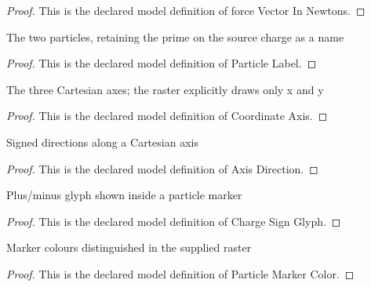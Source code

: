 \begin{proof}
  This is the declared model definition of force Vector In Newtons.
\end{proof}
\begin{definition}
  \label{def:physics:phyx-mini-0963:phyxminiproblems-problemphyxmini0963-particlelabel}
  The two particles, retaining the prime on the source charge as a name
\end{definition}
\begin{proof}
  This is the declared model definition of Particle Label.
\end{proof}
\begin{definition}
  \label{def:physics:phyx-mini-0963:phyxminiproblems-problemphyxmini0963-coordinateaxis}
  The three Cartesian axes; the raster explicitly draws only x and y
\end{definition}
\begin{proof}
  This is the declared model definition of Coordinate Axis.
\end{proof}
\begin{definition}
  \label{def:physics:phyx-mini-0963:phyxminiproblems-problemphyxmini0963-axisdirection}
  Signed directions along a Cartesian axis
\end{definition}
\begin{proof}
  This is the declared model definition of Axis Direction.
\end{proof}
\begin{definition}
  \label{def:physics:phyx-mini-0963:phyxminiproblems-problemphyxmini0963-chargesignglyph}
  Plus/minus glyph shown inside a particle marker
\end{definition}
\begin{proof}
  This is the declared model definition of Charge Sign Glyph.
\end{proof}
\begin{definition}
  \label{def:physics:phyx-mini-0963:phyxminiproblems-problemphyxmini0963-particlemarkercolor}
  Marker colours distinguished in the supplied raster
\end{definition}
\begin{proof}
  This is the declared model definition of Particle Marker Color.
\end{proof}
